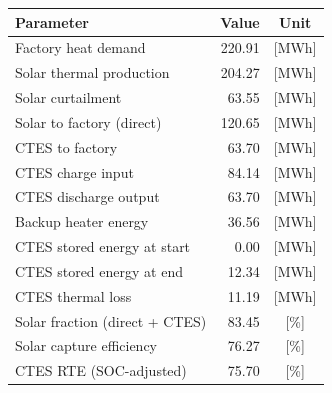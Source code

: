 \renewcommand{\arraystretch}{1.2}
\begin{table}[h]
\centering
\begin{tabular}{l|r c}
\hline
Parameter & Value & Unit \\
\hline
Factory heat demand & 220.91 & [MWh] \\
Solar thermal production & 204.27 & [MWh] \\
Solar curtailment & 63.55 & [MWh] \\
Solar to factory (direct) & 120.65 & [MWh] \\
CTES to factory & 63.70 & [MWh] \\
CTES charge input & 84.14 & [MWh] \\
CTES discharge output & 63.70 & [MWh] \\
Backup heater energy & 36.56 & [MWh] \\
CTES stored energy at start & 0.00 & [MWh] \\
CTES stored energy at end & 12.34 & [MWh] \\
CTES thermal loss & 11.19 & [MWh] \\
\hline
Solar fraction (direct + CTES) & 83.45 & [\%] \\
Solar capture efficiency & 76.27 & [\%] \\
CTES RTE (SOC-adjusted) & 75.70 & [\%] \\
\hline
\end{tabular}
\end{table}
